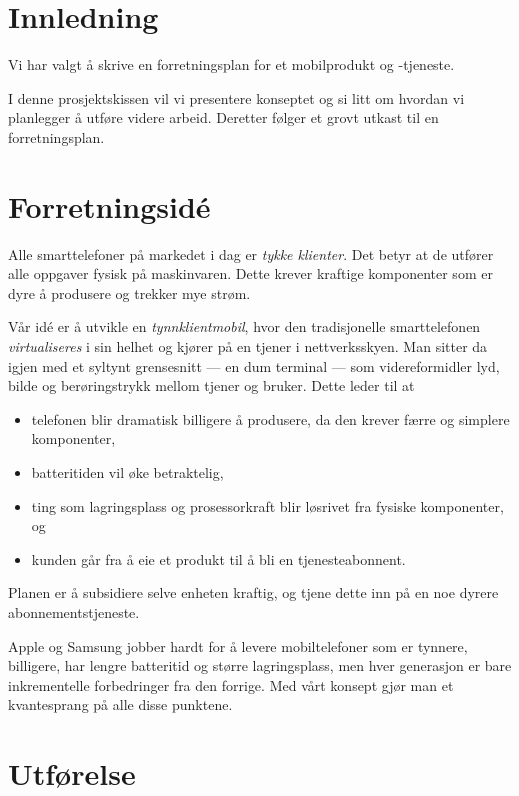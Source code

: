 \section{Innledning}

Vi har valgt å skrive en forretningsplan for et mobilprodukt og -tjeneste.

I denne prosjektskissen vil vi presentere konseptet og si litt om hvordan vi
planlegger å utføre videre arbeid. Deretter følger et grovt utkast til en
forretningsplan.

\section{Forretningsidé}

Alle smarttelefoner på markedet i dag er \textit{tykke klienter}. Det betyr at
de utfører alle oppgaver fysisk på maskinvaren. Dette krever kraftige
komponenter som er dyre å produsere og trekker mye strøm.

Vår idé er å utvikle en \textit{tynnklientmobil}, hvor den tradisjonelle
smarttelefonen \textit{virtualiseres} i sin helhet og kjører på en tjener i
nettverksskyen. Man sitter da igjen med et syltynt grensesnitt --- en dum terminal ---
som videreformidler lyd, bilde og berøringstrykk mellom tjener og bruker. Dette
leder til at
%
\begin{itemize}
  \item telefonen blir dramatisk billigere å produsere, da den krever færre og
    simplere komponenter,
  \item batteritiden vil øke betraktelig,
  \item ting som lagringsplass og prosessorkraft blir løsrivet fra fysiske
    komponenter, og
  \item kunden går fra å eie et produkt til å bli en tjenesteabonnent.
\end{itemize}

Planen er å subsidiere selve enheten kraftig, og tjene dette inn på en noe
dyrere abonnementstjeneste.

Apple og Samsung jobber hardt for å levere mobiltelefoner som er tynnere,
billigere, har lengre batteritid og større lagringsplass, men hver generasjon
er bare inkrementelle forbedringer fra den forrige.  Med vårt konsept gjør man
et kvantesprang på alle disse punktene.
\clearpage
\section{Utførelse}

